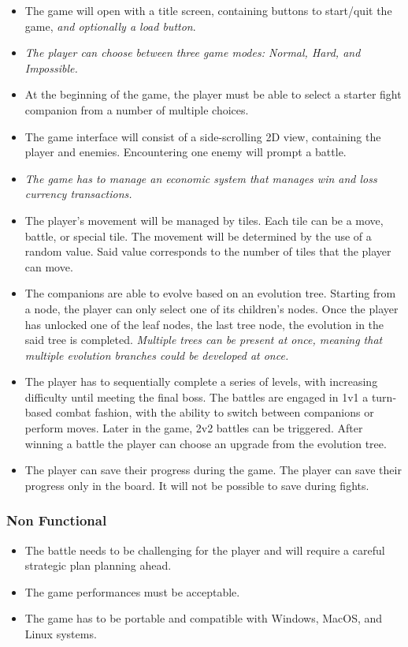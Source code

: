 \documentclass[12pt, a4paper]{report}
\begin{document}
\begin{itemize}
    \item The game will open with a title screen, containing buttons to start/quit the game, \textit{and optionally a load button}.
    \item \textit{The player can choose between three game modes: Normal, Hard, and Impossible.}
    \item At the beginning of the game, the player must be able to select a starter fight companion from a number of multiple choices.
    \item The game interface will consist of a side-scrolling 2D view, containing the player and enemies. Encountering one enemy will prompt a battle.
    \item \textit{The game has to manage an economic system that manages win and loss currency transactions.}
    \item The player's movement will be managed by tiles. Each tile can be a move, battle, or special tile.
        The movement will be determined by the use of a random value. Said value corresponds to the number of tiles that the player can move.
    \item The companions are able to evolve based on an evolution tree. Starting from a node, the player can only select one of its children's nodes.
        Once the player has unlocked one of the leaf nodes, the last tree node, the evolution in the said tree is completed.
        \textit{Multiple trees can be present at once, meaning that multiple evolution branches could be developed at once.}
    \item The player has to sequentially complete a series of levels, with increasing difficulty until meeting the final boss.
        The battles are engaged in 1v1 a turn-based combat fashion, with the ability to switch between companions or perform moves.
        Later in the game, 2v2 battles can be triggered. After winning a battle the player can choose an upgrade from the evolution tree.
    \item The player can save their progress during the game. The player can save their progress only in the board.
        It will not be possible to save during fights.
\end{itemize}

\subsubsection{Non Functional}

\begin{itemize}
    \item The battle needs to be challenging for the player and will require a careful strategic plan planning ahead. \label{challengingbattle}
    \item The game performances must be acceptable.
    \item The game has to be portable and compatible with Windows, MacOS, and Linux systems.
\end{itemize}
\end{document}
